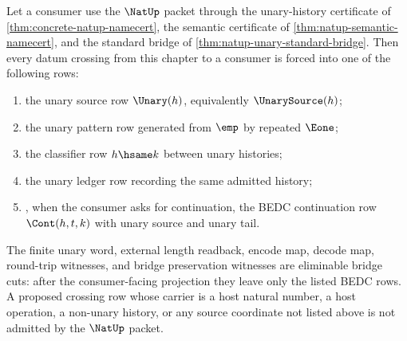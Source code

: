 \begin{theorem}
\label{thm:unary-bridge-cut-boundary}
Let a consumer use the $\NatUp$ packet through the unary-history certificate of
\autoref{thm:concrete-natup-namecert}, the semantic certificate of
\autoref{thm:natup-semantic-namecert}, and the standard bridge of
\autoref{thm:natup-unary-standard-bridge}. Then every datum crossing from this
chapter to a consumer is forced into one of the following rows:
\begin{enumerate}
  \item the unary source row $\Unary(h)$, equivalently
  $\UnarySource(h)$;
  \item the unary pattern row generated from $\emp$ by repeated $\Eone$;
  \item the classifier row $h\hsame k$ between unary histories;
  \item the unary ledger row recording the same admitted history;
  \item, when the consumer asks for continuation, the BEDC continuation row
  $\Cont(h,t,k)$ with unary source and unary tail.
\end{enumerate}
The finite unary word, external length readback, encode map, decode map,
round-trip witnesses, and bridge preservation witnesses are eliminable bridge
cuts: after the consumer-facing projection they leave only the listed BEDC
rows. A proposed crossing row whose carrier is a host natural number, a host
operation, a non-unary history, or any source coordinate not listed above is
not admitted by the $\NatUp$ packet.
\end{theorem}
